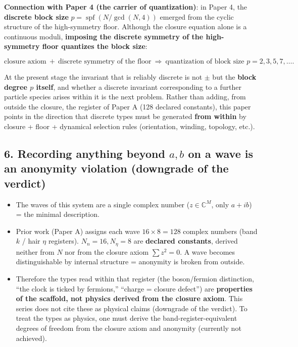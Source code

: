 \documentclass[
  a4paper,
]{ltjsarticle}
\providecommand{\tightlist}{%
  \setlength{\itemsep}{0pt}\setlength{\parskip}{0pt}}
\begin{document}
\textbf{Connection with Paper 4 (the carrier of quantization)}: in Paper
4, the \textbf{discrete block size}
\(p=\operatorname{spf}(N/\gcd(N,4))\) emerged from the cyclic structure
of the high-symmetry floor. Although the closure equation alone is a
continuous moduli, \textbf{imposing the discrete symmetry of the
high-symmetry floor quantizes the block size}:

\[\text{closure axiom}\ +\ \text{discrete symmetry of the floor}\ \Longrightarrow\ \text{quantization of block size }p=2,3,5,7,\ldots.\]

At the present stage the invariant that is reliably discrete is not
\(\pm\) but the \textbf{block degree \(p\) itself}, and whether a
discrete invariant corresponding to a further particle species arises
within it is the next problem. Rather than adding, from outside the
closure, the register of Paper A (128 declared constants), this paper
points in the direction that discrete types must be generated
\textbf{from within} by closure + floor + dynamical selection rules
(orientation, winding, topology, etc.).

\subsection{\texorpdfstring{6. Recording anything beyond \(a,b\) on a
wave is an anonymity violation (downgrade of the
verdict)}{6. Recording anything beyond a,b on a wave is an anonymity violation (downgrade of the verdict)}}\label{recording-anything-beyond-ab-on-a-wave-is-an-anonymity-violation-downgrade-of-the-verdict}

\begin{itemize}
\tightlist
\item
  The waves of this system are a single complex number
  (\(z\in\mathbb C^M\), only \(a+ib\)) = the minimal description.
\item
  Prior work (Paper A) assigns each wave \(16\times8=128\) complex
  numbers (band \(k\) / hair \(\eta\) registers). \(N_n=16,N_\eta=8\)
  are \textbf{declared constants}, derived neither from \(N\) nor from
  the closure axiom \(\sum z^2=0\). A wave becomes distinguishable by
  internal structure = anonymity is broken from outside.
\item
  Therefore the types read within that register (the boson/fermion
  distinction, ``the clock is ticked by fermions,'' ``charge = closure
  defect'') are \textbf{properties of the scaffold, not physics derived
  from the closure axiom}. This series does not cite these as physical
  claims (downgrade of the verdict). To treat the types as physics, one
  must derive the band-register-equivalent degrees of freedom from the
  closure axiom and anonymity (currently not achieved).
\end{itemize}
\end{document}
